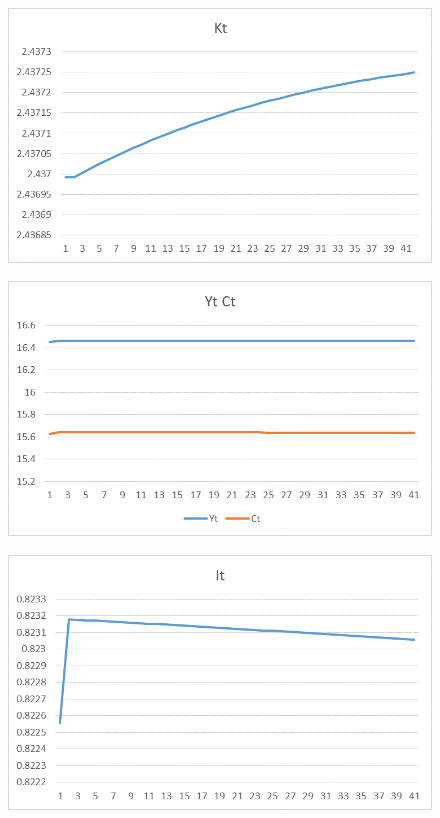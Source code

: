 \documentclass{amsart}
\theoremstyle{plain}
\begin{document}
\begin{figure}[H]
\includegraphics[scale=.50]{13a.png}
\end{figure}
\begin{figure}[H]
\includegraphics[scale=.50]{13b.png}
\end{figure}
\begin{figure}[H]
\includegraphics[scale=.50]{13c.png}
\end{figure}
\end{document}
